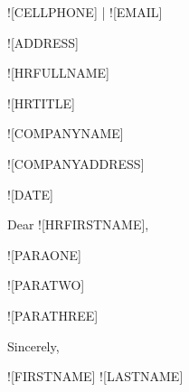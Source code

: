 \documentclass[a4paper]{article}
\renewcommand{\maketitle}{
    \begin{center}
        \color{white}
        {\huge\bfseries\theauthor}
        \vspace{.5em}

        \textsf{![CELLPHONE] | ![EMAIL]} \par
        \textsf{![ADDRESS]}

    \end{center}
}
\begin{document}
%

\author{\textsf{![FIRSTNAME] ![LASTNAME]}}
\maketitle
\vspace{1cm}

![HRFULLNAME]\par
![HRTITLE]\par
![COMPANYNAME]\par
![COMPANYADDRESS]

\bigskip
![DATE]

\bigskip
Dear ![HRFIRSTNAME],

\bigskip
![PARAONE]

\bigskip
![PARATWO]

\bigskip
![PARATHREE]

\bigskip
Sincerely,


\bigskip
![FIRSTNAME] ![LASTNAME]
\end{document}
